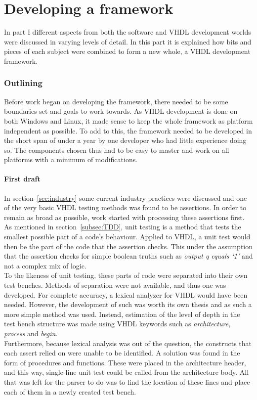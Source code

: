 \documentclass[11pt,british]{article}
\begin{document}
\newpage
\part{Developing a framework}
In part I different aspects from both the software and \gls{VHDL} development worlds were discussed in  varying levels of detail. In this part it is explained how bits and pieces of each subject were combined to form a new whole, a VHDL development framework.

\section{Outlining}
\label{sec:outlining}
Before work began on developing the framework, there needed to be some boundaries set and goals to work towards. As VHDL development is done on both Windows and Linux, it made sense to keep the whole framework as platform independent as possible. To add to this, the framework needed to be developed in the short span of under a year by one developer who had little experience doing so. The components chosen thus had to be easy to master and work on all platforms with a minimum of modifications.

\subsection{First draft}
\label{subsec:first}
In section~\ref{sec:industry} some current industry practices were discussed and one of the very basic VHDL testing methods was found to be assertions. In order to remain as broad as possible, work started with processing these assertions first. As mentioned in section~\ref{subsec:TDD}, unit testing is a method that tests the smallest possible part of a code's behaviour. Applied to \gls{VHDL}, a unit test would then be the part of the code that the assertion checks. This under the assumption that the assertion checks for simple boolean truths such as \emph{output q equals `1'} and not a complex mix of logic.
\\[\baselineskip]
To the likeness of unit testing, these parts of code were separated into their own test benches. Methods of separation were not available, and thus one was developed. For complete accuracy, a lexical analyzer for VHDL would have been needed. However, the development of such was worth its own thesis and as such a more simple method was used. Instead, estimation of the level of depth in the test bench structure was made using VHDL keywords such as \emph{architecture}, \emph{process} and \emph{begin}.
\\[\baselineskip]
Furthermore, because lexical analysis was out of the question, the constructs that each assert relied on were unable to be identified. A solution was found in the form of procedures and functions. These were placed in the architecture header, and this way, single-line unit test could be called from the architecture body. All that was left for the parser to do was to find the location of these lines and place each of them in a newly created test bench.
\end{document}
